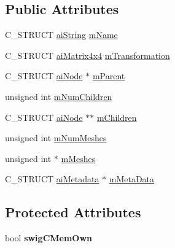 \subsection*{Public Attributes}
\begin{DoxyCompactItemize}
\item 
C\+\_\+\+S\+T\+R\+U\+C\+T \hyperlink{structai_string}{ai\+String} \hyperlink{structai_node_afa528a7e43e15d92a920229b1ff094f6}{m\+Name}
\item 
C\+\_\+\+S\+T\+R\+U\+C\+T \hyperlink{structai_matrix4x4}{ai\+Matrix4x4} \hyperlink{structai_node_aadb69c766c7658bba9d2195af16d6831}{m\+Transformation}
\item 
C\+\_\+\+S\+T\+R\+U\+C\+T \hyperlink{structai_node}{ai\+Node} $\ast$ \hyperlink{structai_node_aa6896b42c78e784db85d822a4c8dd404}{m\+Parent}
\item 
unsigned int \hyperlink{structai_node_af5030494b156ec54632e6182a6e386ca}{m\+Num\+Children}
\item 
C\+\_\+\+S\+T\+R\+U\+C\+T \hyperlink{structai_node}{ai\+Node} $\ast$$\ast$ \hyperlink{structai_node_ac700679f0d4971f124e8444f68057291}{m\+Children}
\item 
unsigned int \hyperlink{structai_node_a7a411079096f86d1e96b6368d237d897}{m\+Num\+Meshes}
\item 
unsigned int $\ast$ \hyperlink{structai_node_acd1706d6508b31916c18e39b7085ca63}{m\+Meshes}
\item 
C\+\_\+\+S\+T\+R\+U\+C\+T \hyperlink{structai_metadata}{ai\+Metadata} $\ast$ \hyperlink{structai_node_a111b5a6cbc5dccde0cf2a17a6e5c3b67}{m\+Meta\+Data}
\end{DoxyCompactItemize}
\subsection*{Protected Attributes}
\begin{DoxyCompactItemize}
\item 
\hypertarget{structai_node_aad82e0a04a584053d33d7ab22d75b42f}{bool {\bfseries swig\+C\+Mem\+Own}}\label{structai_node_aad82e0a04a584053d33d7ab22d75b42f}

\end{DoxyCompactItemize}
